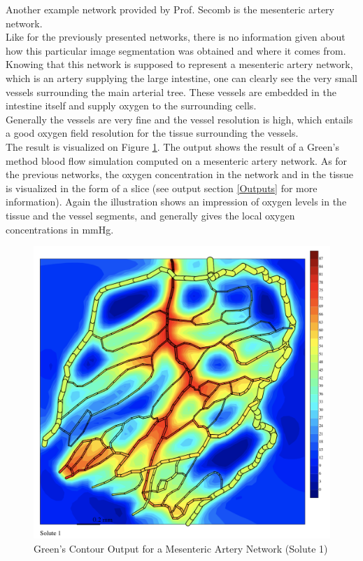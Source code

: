 Another example network provided by Prof. Secomb is the mesenteric artery network.
\\Like for the previously presented networks, there is no information given about how this particular image segmentation was obtained and where it comes from. Knowing that this network is supposed to represent a mesenteric artery network, which is an artery supplying the large intestine, one can clearly see the very small vessels surrounding the main arterial tree. These vessels are embedded in the intestine itself and supply oxygen to the surrounding cells.
\\Generally the vessels are very fine and the vessel resolution is high, which entails a good oxygen field resolution for the tissue surrounding the vessels.
\\The result is visualized on Figure \ref{fig:Contour_Mesent1}. The output shows the result of a Green's method blood flow simulation computed on a mesenteric artery network. As for the previous networks, the oxygen concentration in the network and in the tissue is visualized in the form of a slice (see output section \ref{Outputs} for more information). Again the illustration shows an impression of oxygen levels in the tissue and the vessel segments, and generally gives the local oxygen concentrations in mmHg.
\begin{figure}[h]
\centering
\includegraphics[width=120mm]{Contour_Mesent1}
\caption{\footnotesize Green's Contour Output for a Mesenteric Artery Network (Solute 1)}
\label{fig:Contour_Mesent1}
\end{figure}
